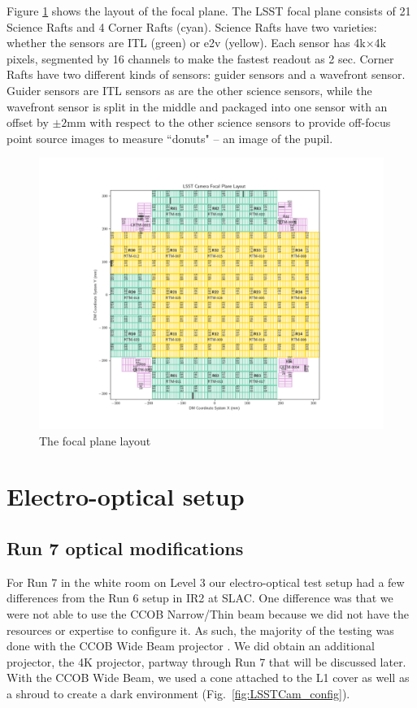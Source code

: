 Figure \ref{fig:focal-plane-layout} shows the layout of the focal plane. The LSST focal plane consists of 21 Science Rafts and 4 Corner Rafts (cyan). Science Rafts have two varieties: whether the sensors are ITL (green) or e2v (yellow). Each sensor has 4k$\times$4k pixels, segmented by 16 channels to make the fastest readout as 2 sec. Corner Rafts have two different kinds of sensors: guider sensors and a wavefront sensor. Guider sensors are ITL sensors as are the other science sensors, while the wavefront sensor is split in the middle and packaged into one sensor with an offset by $\pm2$mm with respect to the other science sensors to provide off-focus point source images to measure ``donuts" -- an image of the pupil.
\begin{figure}
    \centering
    \includegraphics[width=1.0\linewidth]{figures/introduction/LSSTCam_fp_layout_Oct2024.pdf}
    \caption{The focal plane layout}
    \label{fig:focal-plane-layout}
\end{figure}

\section{Electro-optical setup}\label{electro-optical-setup}

\subsection{Run 7 optical modifications}\label{run-7-optical-modifications}

For Run 7 in the white room on Level 3 our electro-optical test setup had a few differences from the Run 6 setup in IR2 at SLAC. One difference was that we were not able to use the CCOB Narrow/Thin beam because we did not have the resources or expertise to configure it. As
such, the majority of the testing was done with the CCOB Wide Beam
projector \citep{2024SPIE13103E..0WU}. We did obtain an additional projector, the 4K projector, partway through Run 7 that will be discussed later. With the CCOB Wide Beam,
we used a cone attached to the L1 cover as well as a shroud to create a
dark environment (Fig.~\ref{fig:LSSTCam_config}).

